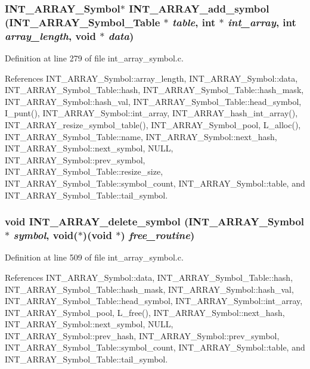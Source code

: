 \subsubsection{\setlength{\rightskip}{0pt plus 5cm}\bf{INT\_\-ARRAY\_\-Symbol}$\ast$ INT\_\-ARRAY\_\-add\_\-symbol (\bf{INT\_\-ARRAY\_\-Symbol\_\-Table} $\ast$ {\em table}, int $\ast$ {\em int\_\-array}, int {\em array\_\-length}, void $\ast$ {\em data})}\label{int__array__symbol_8h_0792cc6c36dfc0546874a3490e2aed35}




Definition at line 279 of file int\_\-array\_\-symbol.c.

References INT\_\-ARRAY\_\-Symbol::array\_\-length, INT\_\-ARRAY\_\-Symbol::data, INT\_\-ARRAY\_\-Symbol\_\-Table::hash, INT\_\-ARRAY\_\-Symbol\_\-Table::hash\_\-mask, INT\_\-ARRAY\_\-Symbol::hash\_\-val, INT\_\-ARRAY\_\-Symbol\_\-Table::head\_\-symbol, I\_\-punt(), INT\_\-ARRAY\_\-Symbol::int\_\-array, INT\_\-ARRAY\_\-hash\_\-int\_\-array(), INT\_\-ARRAY\_\-resize\_\-symbol\_\-table(), INT\_\-ARRAY\_\-Symbol\_\-pool, L\_\-alloc(), INT\_\-ARRAY\_\-Symbol\_\-Table::name, INT\_\-ARRAY\_\-Symbol::next\_\-hash, INT\_\-ARRAY\_\-Symbol::next\_\-symbol, NULL, INT\_\-ARRAY\_\-Symbol::prev\_\-symbol, INT\_\-ARRAY\_\-Symbol\_\-Table::resize\_\-size, INT\_\-ARRAY\_\-Symbol\_\-Table::symbol\_\-count, INT\_\-ARRAY\_\-Symbol::table, and INT\_\-ARRAY\_\-Symbol\_\-Table::tail\_\-symbol.
\subsubsection{\setlength{\rightskip}{0pt plus 5cm}void INT\_\-ARRAY\_\-delete\_\-symbol (\bf{INT\_\-ARRAY\_\-Symbol} $\ast$ {\em symbol}, void($\ast$)(void $\ast$) {\em free\_\-routine})}\label{int__array__symbol_8h_533999339cace50156198164086bcfae}




Definition at line 509 of file int\_\-array\_\-symbol.c.

References INT\_\-ARRAY\_\-Symbol::data, INT\_\-ARRAY\_\-Symbol\_\-Table::hash, INT\_\-ARRAY\_\-Symbol\_\-Table::hash\_\-mask, INT\_\-ARRAY\_\-Symbol::hash\_\-val, INT\_\-ARRAY\_\-Symbol\_\-Table::head\_\-symbol, INT\_\-ARRAY\_\-Symbol::int\_\-array, INT\_\-ARRAY\_\-Symbol\_\-pool, L\_\-free(), INT\_\-ARRAY\_\-Symbol::next\_\-hash, INT\_\-ARRAY\_\-Symbol::next\_\-symbol, NULL, INT\_\-ARRAY\_\-Symbol::prev\_\-hash, INT\_\-ARRAY\_\-Symbol::prev\_\-symbol, INT\_\-ARRAY\_\-Symbol\_\-Table::symbol\_\-count, INT\_\-ARRAY\_\-Symbol::table, and INT\_\-ARRAY\_\-Symbol\_\-Table::tail\_\-symbol.
